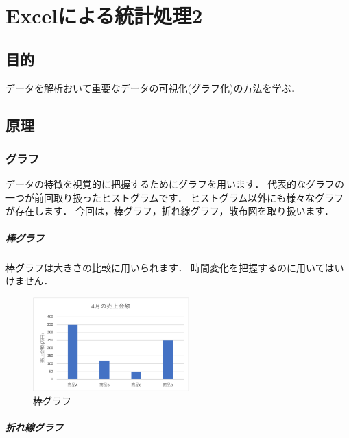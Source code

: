 

\chapter{Excelによる統計処理2}
\setcounter{num_prac}{0}

\section{目的}

データを解析おいて重要なデータの可視化(グラフ化)の方法を学ぶ．

\section{原理}

\subsection{グラフ}

データの特徴を視覚的に把握するためにグラフを用います．
代表的なグラフの一つが前回取り扱ったヒストグラムです．
ヒストグラム以外にも様々なグラフが存在します．
今回は，棒グラフ，折れ線グラフ，散布図を取り扱います．

\paragraph{棒グラフ}

棒グラフは大きさの比較に用いられます．
時間変化を把握するのに用いてはいけません．

\begin{figure}[htbp]
    \centering
    \includegraphics[width=6cm]{chap2/bar.png}
    \caption{棒グラフ}
    \label{fig:bar}
\end{figure}

\paragraph{折れ線グラフ}

